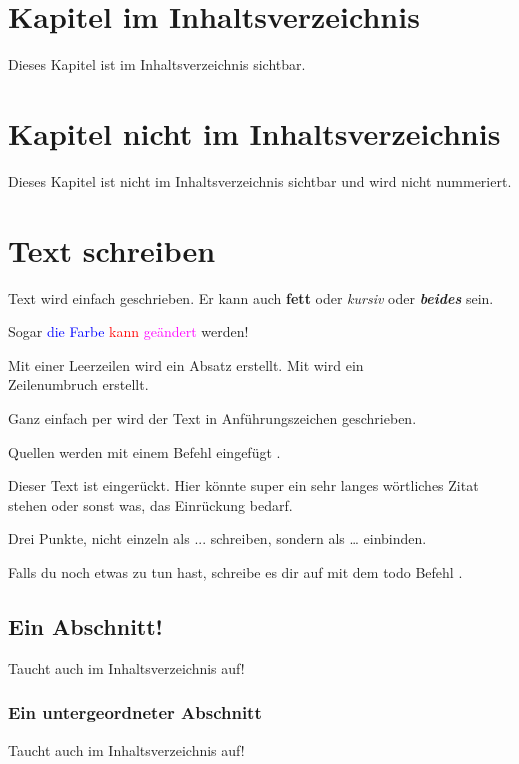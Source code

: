 \chapter{Kapitel im Inhaltsverzeichnis}
Dieses Kapitel ist im Inhaltsverzeichnis sichtbar.

\chapter*{Kapitel nicht im Inhaltsverzeichnis}
Dieses Kapitel ist nicht im Inhaltsverzeichnis sichtbar und wird nicht nummeriert.

\chapter{Text schreiben}
Text wird einfach geschrieben.
Er kann auch \textbf{fett} oder \textit{kursiv} oder \textit{\textbf{beides}} sein.

Sogar \textcolor{blue}{die Farbe} \textcolor{red}{kann} \textcolor{magenta}{geändert} werden!

Mit einer Leerzeilen wird ein Absatz erstellt.
Mit \anfz{\textbackslash\textbackslash} wird ein\\
Zeilenumbruch erstellt.

Ganz einfach per  wird der Text in Anführungszeichen geschrieben.

Quellen werden mit einem  Befehl eingefügt \cite{Tietze2010}.

\begin{addmargin}[2em]{0pt}
    Dieser Text ist eingerückt. Hier könnte super ein sehr langes wörtliches Zitat stehen oder sonst was, das Einrückung bedarf.
\end{addmargin}

Drei Punkte, nicht einzeln als ... schreiben, sondern als \dots{} einbinden.

Falls du noch etwas zu tun hast, schreibe es dir auf mit dem todo Befehl .

\section{Ein Abschnitt!}
Taucht auch im Inhaltsverzeichnis auf!
\subsection{Ein untergeordneter Abschnitt}
Taucht auch im Inhaltsverzeichnis auf!
